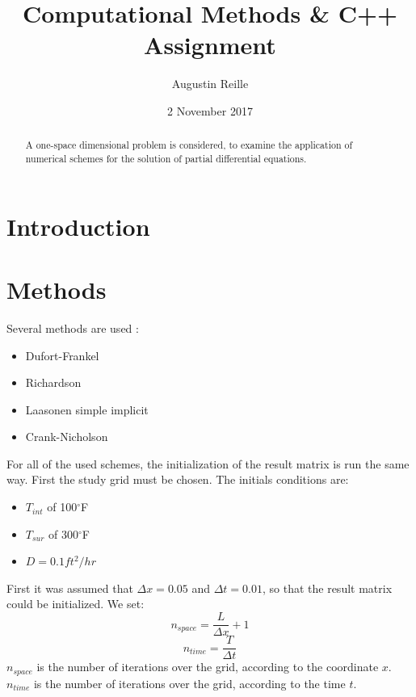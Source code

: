 \documentclass{article}
\title{Computational Methods \& C++ Assignment}
\author{Augustin Reille}
\date{2 November 2017}
\begin{document}
    \maketitle

    \begin{abstract}
        A one-space dimensional problem is considered, to examine the application
        of numerical schemes for the solution of partial differential equations. 
    \end{abstract}

    \newpage
    \tableofcontents

    \newpage
    \listoffigures

    \listoftables

    

    \newpage
    \section{Introduction}

    
    \newpage
    \section{Methods}


        Several methods are used :
        \begin{itemize}
            \item{Dufort-Frankel}
            \item{Richardson}
            \item{Laasonen simple implicit}
            \item{Crank-Nicholson}
        \end{itemize}
        For all of the used schemes, the initialization of the result matrix is run the same way.
        First the study grid must be chosen. The initials conditions are:
        \begin{itemize}
            \item{$T_{int}$ of 100$^{\circ}$F}
            \item{$T_{sur}$ of 300$^{\circ}$F}
            \item{$D = 0.1 ft^{2}/hr$}
        \end{itemize}
        First it was assumed that $\Delta x = 0.05$ and $\Delta t = 0.01$,
        so that the result matrix could be initialized.
        We set:
        \begin{equation}
            n_{space} = \frac{L}{\Delta x} + 1
        \end{equation}
        \begin{equation}
            n_{time} = \frac{T}{\Delta t}
        \end{equation}
        $n_{space}$ is the number of iterations over the grid, according to the coordinate $x$. \\
        $n_{time}$ is the number of iterations over the grid, according to the time $t$. \\
        
\end{document}
